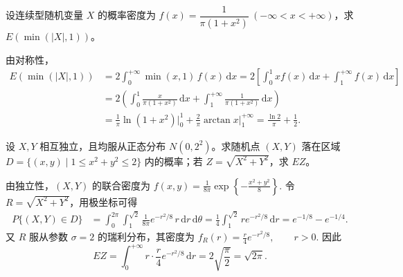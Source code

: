 \documentclass[lang=cn,11pt]{elegantbook}
\begin{document}
\begin{exercise}\label{exer:4-s14-cauchymin}
设连续型随机变量 \(X\) 的概率密度为 \(f(x) = \dfrac{1}{\pi(1+x^2)}\ (-\infty < x < +\infty)\)，求 \(E(\min(|X|,1))\)。
\end{exercise}

\begin{solution}
由对称性，
\[
\begin{aligned}
E(\min(|X|,1)) &= 2\int_0^{+\infty}\min(x,1)\,f(x)\,\mathrm{d}x = 2\left[\int_0^1 x f(x)\,\mathrm{d}x + \int_1^{+\infty} f(x)\,\mathrm{d}x\right] \\
&= 2\left(\int_0^1 \frac{x}{\pi(1+x^2)}\,\mathrm{d}x + \int_1^{+\infty}\frac{1}{\pi(1+x^2)}\,\mathrm{d}x\right) \\
&= \frac{1}{\pi}\ln(1+x^2)\Big|_0^1 + \frac{2}{\pi}\arctan x\Big|_1^{+\infty} = \frac{\ln 2}{\pi} + \frac{1}{2}.
\end{aligned}
\]
\end{solution}


\begin{exercise}\label{exer:src-2014-spring-a-05}
设 \(X,Y\) 相互独立，且均服从正态分布 \(N(0,2^2)\)。求随机点 \((X,Y)\) 落在区域
\(
D=\{(x,y)\mid 1\le x^2+y^2\le2\}
\)
内的概率；若 \(Z=\sqrt{X^2+Y^2}\)，求 \(EZ\)。
\end{exercise}
\begin{solution}
由独立性，\((X,Y)\) 的联合密度为
\(
f(x,y)=\frac1{8\pi}\exp\!\left\{-\frac{x^2+y^2}{8}\right\}.
\)
令 \(R=\sqrt{X^2+Y^2}\)，用极坐标可得
\[
\begin{aligned}
P\{(X,Y)\in D\}
&=\int_0^{2\pi}\int_1^{\sqrt2}
\frac1{8\pi}e^{-r^2/8}\,r\,\mathrm dr\,\mathrm d\theta=\frac14\int_1^{\sqrt2}r e^{-r^2/8}\,\mathrm dr
=e^{-1/8}-e^{-1/4}.
\end{aligned}
\]
又 \(R\) 服从参数 \(\sigma=2\) 的瑞利分布，其密度为
\(
f_R(r)=\frac{r}{4}e^{-r^2/8},\qquad r>0.
\)
因此
\[
EZ=\int_0^{+\infty}r\cdot\frac{r}{4}e^{-r^2/8}\,\mathrm dr
=2\sqrt{\frac\pi2}=\sqrt{2\pi}.
\]
\end{solution}
\end{document}
